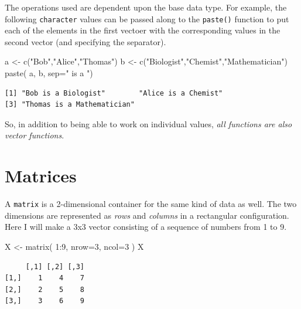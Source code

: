 \documentclass[
  letterpaper,
]{book}
\newenvironment{Shaded}{\begin{snugshade}}{\end{snugshade}}
\newcommand{\AttributeTok}[1]{\textcolor[rgb]{0.40,0.45,0.13}{#1}}
\newcommand{\DecValTok}[1]{\textcolor[rgb]{0.68,0.00,0.00}{#1}}
\newcommand{\FunctionTok}[1]{\textcolor[rgb]{0.28,0.35,0.67}{#1}}
\newcommand{\NormalTok}[1]{\textcolor[rgb]{0.00,0.23,0.31}{#1}}
\newcommand{\OtherTok}[1]{\textcolor[rgb]{0.00,0.23,0.31}{#1}}
\newcommand{\SpecialCharTok}[1]{\textcolor[rgb]{0.37,0.37,0.37}{#1}}
\newcommand{\StringTok}[1]{\textcolor[rgb]{0.13,0.47,0.30}{#1}}
\begin{document}
The operations used are dependent upon the base data type. For example,
the following \texttt{character} values can be passed along to the
\texttt{paste()} function to put each of the elements in the first
vectoer with the corresponding values in the second vector (and
specifying the separator).

\begin{Shaded}
\begin{Highlighting}[]
\NormalTok{a }\OtherTok{\textless{}{-}} \FunctionTok{c}\NormalTok{(}\StringTok{"Bob"}\NormalTok{,}\StringTok{"Alice"}\NormalTok{,}\StringTok{"Thomas"}\NormalTok{)}
\NormalTok{b }\OtherTok{\textless{}{-}} \FunctionTok{c}\NormalTok{(}\StringTok{"Biologist"}\NormalTok{,}\StringTok{"Chemist"}\NormalTok{,}\StringTok{"Mathematician"}\NormalTok{)}
\FunctionTok{paste}\NormalTok{( a, b, }\AttributeTok{sep=}\StringTok{" is a "}\NormalTok{)}
\end{Highlighting}
\end{Shaded}

\begin{verbatim}
[1] "Bob is a Biologist"        "Alice is a Chemist"       
[3] "Thomas is a Mathematician"
\end{verbatim}

So, in addition to being able to work on individual values, \emph{all
functions are also vector functions}.

\section{Matrices}\label{matrices}

A \texttt{matrix} is a 2-dimensional container for the same kind of data
as well. The two dimensions are represented as \emph{rows} and
\emph{columns} in a rectangular configuration. Here I will make a 3x3
vector consisting of a sequence of numbers from 1 to 9.

\begin{Shaded}
\begin{Highlighting}[]
\NormalTok{X }\OtherTok{\textless{}{-}} \FunctionTok{matrix}\NormalTok{( }\DecValTok{1}\SpecialCharTok{:}\DecValTok{9}\NormalTok{, }\AttributeTok{nrow=}\DecValTok{3}\NormalTok{, }\AttributeTok{ncol=}\DecValTok{3}\NormalTok{ )}
\NormalTok{X}
\end{Highlighting}
\end{Shaded}

\begin{verbatim}
     [,1] [,2] [,3]
[1,]    1    4    7
[2,]    2    5    8
[3,]    3    6    9
\end{verbatim}
\end{document}
